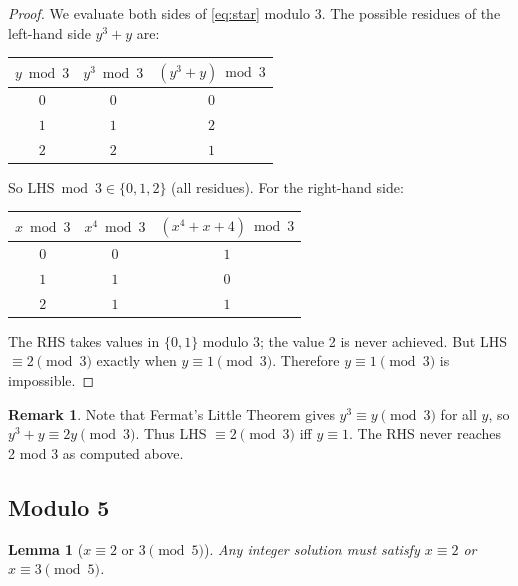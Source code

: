 \documentclass[12pt, a4paper]{article}
\newtheorem{lemma}[theorem]{Lemma}
\theoremstyle{definition}
\newtheorem{remark}[theorem]{Remark}
\begin{document}
\begin{proof}
  We evaluate both sides of \eqref{eq:star} modulo 3.  The possible residues
  of the left-hand side $y^3 + y$ are:

  \begin{center}
  \begin{tabular}{ccc}
  \toprule
  $y \bmod 3$ & $y^3 \bmod 3$ & $(y^3+y) \bmod 3$ \\
  \midrule
  $0$ & $0$ & $0$ \\
  $1$ & $1$ & $2$ \\
  $2$ & $2$ & $1$ \\
  \bottomrule
  \end{tabular}
  \end{center}

  So $\text{LHS} \bmod 3 \in \{0, 1, 2\}$ (all residues).  For the right-hand side:

  \begin{center}
  \begin{tabular}{ccc}
  \toprule
  $x \bmod 3$ & $x^4 \bmod 3$ & $(x^4+x+4) \bmod 3$ \\
  \midrule
  $0$ & $0$ & $1$ \\
  $1$ & $1$ & $0$ \\
  $2$ & $1$ & $1$ \\
  \bottomrule
  \end{tabular}
  \end{center}

  The RHS takes values in $\{0, 1\}$ modulo 3; the value 2 is never achieved.
  But LHS $\equiv 2 \pmod{3}$ exactly when $y \equiv 1 \pmod{3}$.
  Therefore $y \equiv 1 \pmod{3}$ is impossible.
\end{proof}

\begin{remark}
  Note that Fermat's Little Theorem gives $y^3 \equiv y \pmod 3$ for all $y$,
  so $y^3 + y \equiv 2y \pmod 3$.  Thus LHS $\equiv 2 \pmod 3$ iff $y \equiv 1$.
  The RHS never reaches 2 mod 3 as computed above.
\end{remark}

\subsection{Modulo 5}

\begin{lemma}[$x \equiv 2$ or $3 \pmod{5}$]\label{lem:x_mod5}
  Any integer solution must satisfy $x \equiv 2$ or $x \equiv 3 \pmod{5}$.
\end{lemma}
\end{document}
